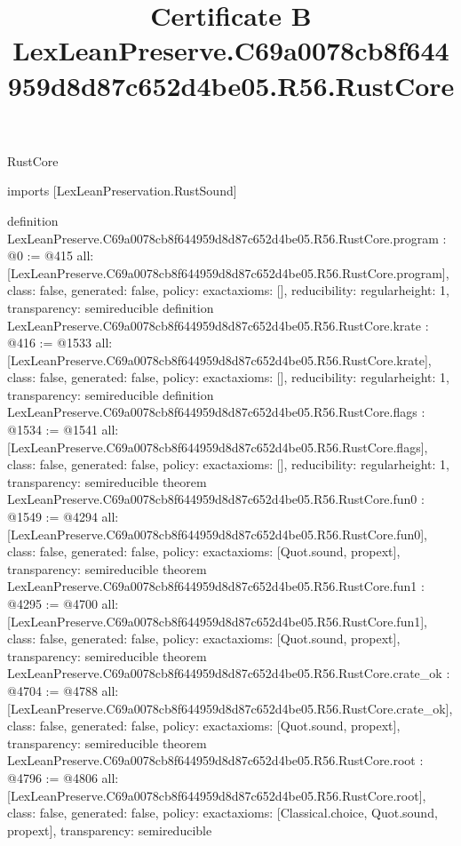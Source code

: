 \begin{lexlean}{RustCore}
\title{Certificate B LexLeanPreserve.C69a0078cb8f644959d8d87c652d4be05.R56.RustCore}
\begin{coremodule}
imports [LexLeanPreservation.RustSound]

definition LexLeanPreserve.C69a0078cb8f644959d8d87c652d4be05.R56.RustCore.program : @0 := @415 {
  all: [LexLeanPreserve.C69a0078cb8f644959d8d87c652d4be05.R56.RustCore.program],
  class: false,
  generated: false,
  policy: exact{axioms: []},
  reducibility: regular{height: 1},
  transparency: semireducible
}
definition LexLeanPreserve.C69a0078cb8f644959d8d87c652d4be05.R56.RustCore.krate : @416 := @1533 {
  all: [LexLeanPreserve.C69a0078cb8f644959d8d87c652d4be05.R56.RustCore.krate],
  class: false,
  generated: false,
  policy: exact{axioms: []},
  reducibility: regular{height: 1},
  transparency: semireducible
}
definition LexLeanPreserve.C69a0078cb8f644959d8d87c652d4be05.R56.RustCore.flags : @1534 := @1541 {
  all: [LexLeanPreserve.C69a0078cb8f644959d8d87c652d4be05.R56.RustCore.flags],
  class: false,
  generated: false,
  policy: exact{axioms: []},
  reducibility: regular{height: 1},
  transparency: semireducible
}
theorem LexLeanPreserve.C69a0078cb8f644959d8d87c652d4be05.R56.RustCore.fun0 : @1549 := @4294 {
  all: [LexLeanPreserve.C69a0078cb8f644959d8d87c652d4be05.R56.RustCore.fun0],
  class: false,
  generated: false,
  policy: exact{axioms: [Quot.sound, propext]},
  transparency: semireducible
}
theorem LexLeanPreserve.C69a0078cb8f644959d8d87c652d4be05.R56.RustCore.fun1 : @4295 := @4700 {
  all: [LexLeanPreserve.C69a0078cb8f644959d8d87c652d4be05.R56.RustCore.fun1],
  class: false,
  generated: false,
  policy: exact{axioms: [Quot.sound, propext]},
  transparency: semireducible
}
theorem LexLeanPreserve.C69a0078cb8f644959d8d87c652d4be05.R56.RustCore.crate_ok : @4704 := @4788 {
  all: [LexLeanPreserve.C69a0078cb8f644959d8d87c652d4be05.R56.RustCore.crate_ok],
  class: false,
  generated: false,
  policy: exact{axioms: [Quot.sound, propext]},
  transparency: semireducible
}
theorem LexLeanPreserve.C69a0078cb8f644959d8d87c652d4be05.R56.RustCore.root : @4796 := @4806 {
  all: [LexLeanPreserve.C69a0078cb8f644959d8d87c652d4be05.R56.RustCore.root],
  class: false,
  generated: false,
  policy: exact{axioms: [Classical.choice, Quot.sound, propext]},
  transparency: semireducible
}


\end{coremodule}
\end{lexlean}
